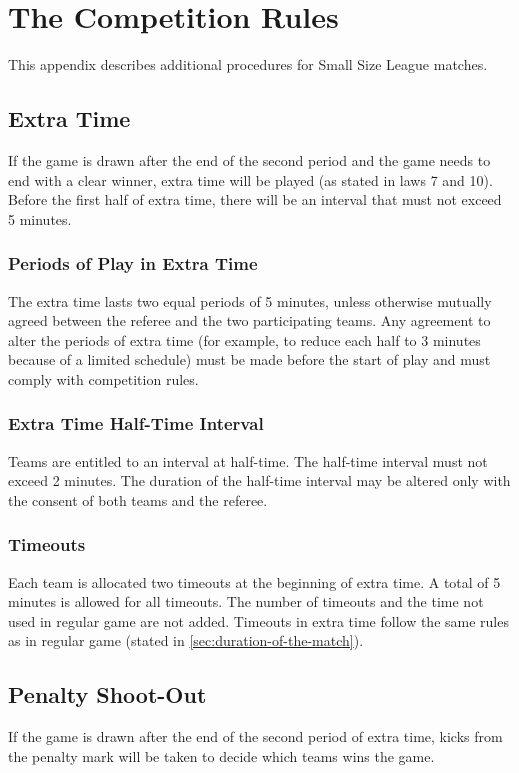 \section{The Competition Rules}\label{app:competition-rules}

This appendix describes additional procedures for Small Size League matches.

\subsection{Extra Time}
If the game is drawn after the end of the second period and the game needs to end with a clear winner, extra time will be played (as stated in laws 7 and 10).
Before the first half of extra time, there will be an interval that must not exceed 5 minutes.

\subsubsection{Periods of Play in Extra Time}
The extra time lasts two equal periods of 5 minutes, unless otherwise mutually agreed between the referee and the two participating teams.
Any agreement to alter the periods of extra time (for example, to reduce each half to 3 minutes because of a limited schedule) must be made before the start of play and must comply with competition rules.

\subsubsection{Extra Time Half-Time Interval}
Teams are entitled to an interval at half-time.
The half-time interval must not exceed 2 minutes.
The duration of the half-time interval may be altered only with the consent of both teams and the referee.

\subsubsection{Timeouts}
Each team is allocated two timeouts at the beginning of extra time.
A total of 5 minutes is allowed for all timeouts.
The number of timeouts and the time not used in regular game are not added.
Timeouts in extra time follow the same rules as in regular game (stated in \autoref{sec:duration-of-the-match}).

\subsection{Penalty Shoot-Out}
If the game is drawn after the end of the second period of extra time, kicks from the penalty mark will be taken to decide which teams wins the game.

